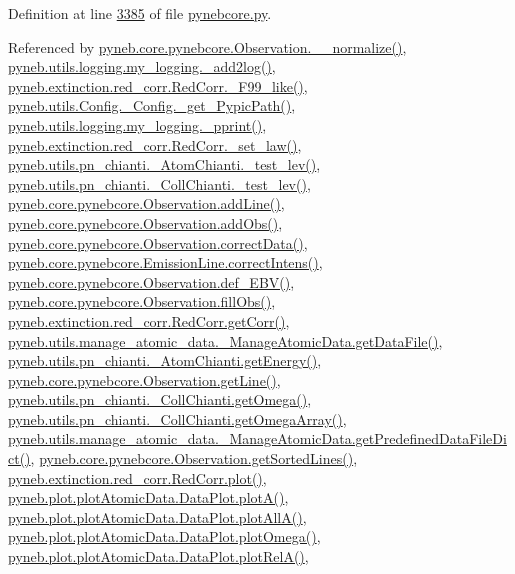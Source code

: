 Definition at line \hyperlink{pynebcore_8py_source_l03385}{3385} of file \hyperlink{pynebcore_8py_source}{pynebcore.\-py}.



Referenced by \hyperlink{pynebcore_8py_source_l04007}{pyneb.\-core.\-pynebcore.\-Observation.\-\_\-\-\_\-normalize()}, \hyperlink{logging_8py_source_l00059}{pyneb.\-utils.\-logging.\-my\-\_\-logging.\-\_\-add2log()}, \hyperlink{red__corr_8py_source_l00658}{pyneb.\-extinction.\-red\-\_\-corr.\-Red\-Corr.\-\_\-\-F99\-\_\-like()}, \hyperlink{_config_8py_source_l00115}{pyneb.\-utils.\-Config.\-\_\-\-Config.\-\_\-get\-\_\-\-Pypic\-Path()}, \hyperlink{logging_8py_source_l00051}{pyneb.\-utils.\-logging.\-my\-\_\-logging.\-\_\-pprint()}, \hyperlink{red__corr_8py_source_l00176}{pyneb.\-extinction.\-red\-\_\-corr.\-Red\-Corr.\-\_\-set\-\_\-law()}, \hyperlink{pn__chianti_8py_source_l00304}{pyneb.\-utils.\-pn\-\_\-chianti.\-\_\-\-Atom\-Chianti.\-\_\-test\-\_\-lev()}, \hyperlink{pn__chianti_8py_source_l00472}{pyneb.\-utils.\-pn\-\_\-chianti.\-\_\-\-Coll\-Chianti.\-\_\-test\-\_\-lev()}, \hyperlink{pynebcore_8py_source_l03558}{pyneb.\-core.\-pynebcore.\-Observation.\-add\-Line()}, \hyperlink{pynebcore_8py_source_l03589}{pyneb.\-core.\-pynebcore.\-Observation.\-add\-Obs()}, \hyperlink{pynebcore_8py_source_l04028}{pyneb.\-core.\-pynebcore.\-Observation.\-correct\-Data()}, \hyperlink{pynebcore_8py_source_l03447}{pyneb.\-core.\-pynebcore.\-Emission\-Line.\-correct\-Intens()}, \hyperlink{pynebcore_8py_source_l03983}{pyneb.\-core.\-pynebcore.\-Observation.\-def\-\_\-\-E\-B\-V()}, \hyperlink{pynebcore_8py_source_l03574}{pyneb.\-core.\-pynebcore.\-Observation.\-fill\-Obs()}, \hyperlink{red__corr_8py_source_l00211}{pyneb.\-extinction.\-red\-\_\-corr.\-Red\-Corr.\-get\-Corr()}, \hyperlink{manage__atomic__data_8py_source_l00297}{pyneb.\-utils.\-manage\-\_\-atomic\-\_\-data.\-\_\-\-Manage\-Atomic\-Data.\-get\-Data\-File()}, \hyperlink{pn__chianti_8py_source_l00366}{pyneb.\-utils.\-pn\-\_\-chianti.\-\_\-\-Atom\-Chianti.\-get\-Energy()}, \hyperlink{pynebcore_8py_source_l03665}{pyneb.\-core.\-pynebcore.\-Observation.\-get\-Line()}, \hyperlink{pn__chianti_8py_source_l00507}{pyneb.\-utils.\-pn\-\_\-chianti.\-\_\-\-Coll\-Chianti.\-get\-Omega()}, \hyperlink{pn__chianti_8py_source_l00484}{pyneb.\-utils.\-pn\-\_\-chianti.\-\_\-\-Coll\-Chianti.\-get\-Omega\-Array()}, \hyperlink{manage__atomic__data_8py_source_l00034}{pyneb.\-utils.\-manage\-\_\-atomic\-\_\-data.\-\_\-\-Manage\-Atomic\-Data.\-get\-Predefined\-Data\-File\-Dict()}, \hyperlink{pynebcore_8py_source_l03684}{pyneb.\-core.\-pynebcore.\-Observation.\-get\-Sorted\-Lines()}, \hyperlink{red__corr_8py_source_l00303}{pyneb.\-extinction.\-red\-\_\-corr.\-Red\-Corr.\-plot()}, \hyperlink{plot_atomic_data_8py_source_l00117}{pyneb.\-plot.\-plot\-Atomic\-Data.\-Data\-Plot.\-plot\-A()}, \hyperlink{plot_atomic_data_8py_source_l00189}{pyneb.\-plot.\-plot\-Atomic\-Data.\-Data\-Plot.\-plot\-All\-A()}, \hyperlink{plot_atomic_data_8py_source_l00373}{pyneb.\-plot.\-plot\-Atomic\-Data.\-Data\-Plot.\-plot\-Omega()}, \hyperlink{plot_atomic_data_8py_source_l00262}{pyneb.\-plot.\-plot\-Atomic\-Data.\-Data\-Plot.\-plot\-Rel\-A()}, 